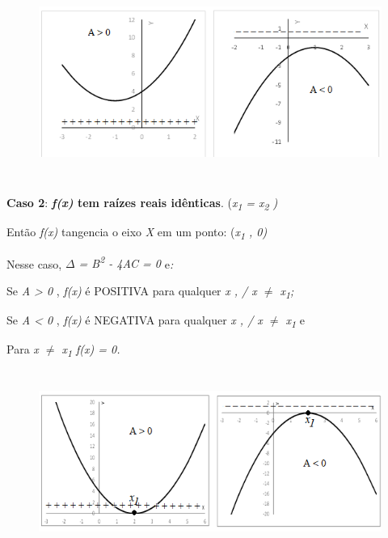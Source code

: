 \begin{figure}[H]
	\begin{Center}
		\includegraphics[width=5.74in,height=2.52in]{capitulos/funcao_do_segundo_grau/media/image12.png}
	\end{Center}
\end{figure}

\textbf{Caso 2}: \textbf{\textit{f(x)}  tem raízes reais idênticas}.  (\textit{x\textsubscript{1} = x\textsubscript{2} )}   

Então \textit{f(x)}  tangencia o eixo \textit{X} em um ponto: (\textit{x\textsubscript{1} , 0)}   

Nesse caso, \textit{$ \Delta $  = B\textsuperscript{2} - 4AC = 0   }e\textit{:  }

Se \textit{A > 0} ,   \textit{f(x)} é POSITIVA para qualquer \textit{x   , / x $ \neq $  x\textsubscript{1};}

Se \textit{A < 0} ,   \textit{f(x)} é NEGATIVA para qualquer \textit{x   , / x $ \neq $  x\textsubscript{1  }}e

Para \textit{x $ \neq $  x\textsubscript{1}   f(x) = 0.}

\begin{figure}[H]
	\begin{Center}
		\includegraphics[width=5.67in,height=2.32in]{capitulos/funcao_do_segundo_grau/media/image13.png}
	\end{Center}
\end{figure}

